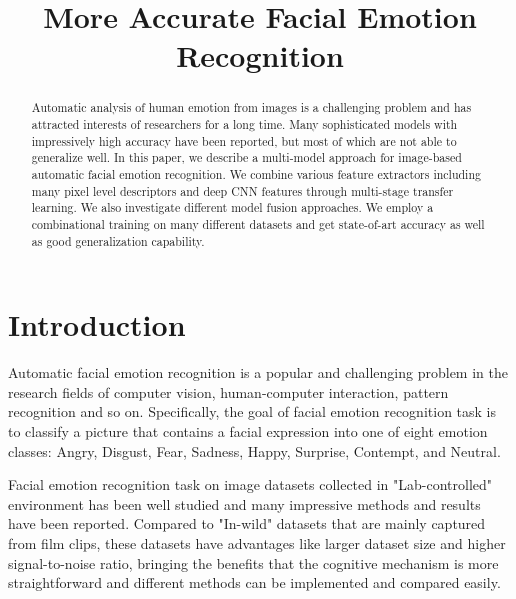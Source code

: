 \documentclass[conference]{IEEEtran}
\begin{document}
\title{More Accurate Facial Emotion Recognition}

\author{
\and
{}
\and
{}
}

\maketitle

\begin{abstract}
Automatic analysis of human emotion from images is a challenging problem and has attracted interests of researchers for a long time. Many sophisticated models with impressively high accuracy have been reported, but most of which are not able to generalize well. In this paper, we describe a multi-model approach for image-based automatic facial emotion recognition. We combine various feature extractors including many pixel level descriptors and deep CNN features through multi-stage transfer learning. We also investigate different model fusion approaches. We employ a combinational training on many different datasets and get state-of-art accuracy as well as good generalization capability.
\end{abstract}

\section{Introduction}
Automatic facial emotion recognition is a popular and challenging problem in the research fields of computer vision, human-computer interaction, pattern recognition and so on. Specifically, the goal of facial emotion recognition task is to classify a picture that contains a facial expression into one of eight emotion classes: Angry, Disgust, Fear, Sadness, Happy, Surprise, Contempt, and Neutral.

Facial emotion recognition task on image datasets collected in "Lab-controlled" environment has been well studied and many impressive methods and results have been reported. Compared to "In-wild" datasets that are mainly captured from film clips, these datasets have advantages like larger dataset size and higher signal-to-noise ratio, bringing the benefits that the cognitive mechanism is more straightforward and different methods can be implemented and compared easily.
\end{document}
